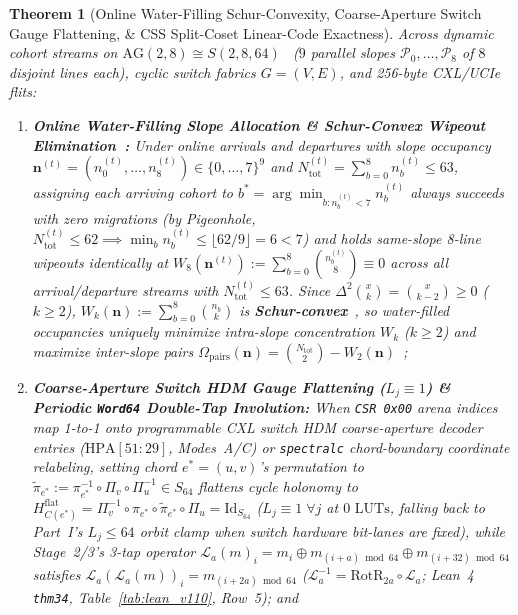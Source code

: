 \documentclass[10pt,twocolumn]{article}
\theoremstyle{spectralthm}
\newtheorem{theorem}{Theorem}[section]
\begin{document}
\begin{theorem}[Online Water-Filling Schur-Convexity, Coarse-Aperture Switch Gauge Flattening, \& CSS Split-Coset Linear-Code Exactness]
\label{thm:homological_unification}
Across dynamic cohort streams on $\mathrm{AG}(2,8) \cong S(2,8,64)$~\cite{kautz1964nonrandom,welch1974lower,macwilliams1977theory} ($9$ parallel slopes $\mathcal{P}_0,\ldots,\mathcal{P}_8$ of $8$ disjoint lines each), cyclic switch fabrics $G = (V,E)$, and 256-byte CXL/UCIe flits:
\begin{enumerate}
  \item[(i)] \textbf{Online Water-Filling Slope Allocation \& Schur-Convex Wipeout Elimination~\cite{marshall2011inequalities}:} Under online arrivals and departures with slope occupancy $\mathbf{n}^{(t)} = (n_0^{(t)},\ldots,n_8^{(t)}) \in \{0,\ldots,7\}^9$ and $N_{\mathrm{tot}}^{(t)} = \sum_{b=0}^8 n_b^{(t)} \le 63$, assigning each arriving cohort to $b^* = \arg\min_{b : n_b^{(t)} < 7} n_b^{(t)}$ always succeeds with \emph{zero migrations} (by Pigeonhole, $N_{\mathrm{tot}}^{(t)} \le 62 \implies \min_b n_b^{(t)} \le \lfloor 62/9 \rfloor = 6 < 7$) and holds same-slope 8-line wipeouts identically at $W_8(\mathbf{n}^{(t)}) := \sum_{b=0}^8 \binom{n_b^{(t)}}{8} \equiv 0$ across all arrival/departure streams with $N_{\mathrm{tot}}^{(t)} \le 63$. Since $\Delta^2 \binom{x}{k} = \binom{x}{k-2} \ge 0$ ($k \ge 2$), $W_k(\mathbf{n}) := \sum_{b=0}^8 \binom{n_b}{k}$ is \textbf{Schur-convex}~\cite{marshall2011inequalities}, so water-filled occupancies uniquely minimize intra-slope concentration $W_k$ ($k \ge 2$) and maximize inter-slope pairs $\Omega_{\mathrm{pairs}}(\mathbf{n}) = \binom{N_{\mathrm{tot}}}{2} - W_2(\mathbf{n})$~\cite{calinescu2011maximizing};
  \item[(ii)] \textbf{Coarse-Aperture Switch HDM Gauge Flattening ($L_j \equiv 1$) \& Periodic \texttt{Word64} Double-Tap Involution:} When \texttt{CSR 0x00} arena indices map 1-to-1 onto programmable CXL switch HDM coarse-aperture decoder entries ($\mathrm{HPA}[51:29]$, Modes~A/C) or \texttt{spectralc} chord-boundary coordinate relabeling, setting chord $e^* = (u,v)$'s permutation to $\widetilde{\pi}_{e^*} := \pi_{e^*}^{-1} \circ \Pi_v \circ \Pi_u^{-1} \in S_{64}$ flattens cycle holonomy to $H_{C(e^*)}^{\mathrm{flat}} = \Pi_v^{-1} \circ \pi_{e^*} \circ \widetilde{\pi}_{e^*} \circ \Pi_u = \mathrm{Id}_{S_{64}}$ ($L_j \equiv 1\;\forall j$ at $0\text{~LUTs}$, falling back to Part~I's $L_j \le 64$ orbit clamp when switch hardware bit-lanes are fixed), while Stage~2/3's 3-tap operator $\mathcal{L}_a(m)_i = m_i \oplus m_{(i+a)\bmod 64} \oplus m_{(i+32)\bmod 64}$ satisfies $\mathcal{L}_a(\mathcal{L}_a(m))_i = m_{(i+2a)\bmod 64}$ ($\mathcal{L}_a^{-1} = \mathrm{RotR}_{2a}\circ\mathcal{L}_a$; Lean~4 \texttt{thm34}, Table~\ref{tab:lean_v110}, Row~5); and

\end{enumerate}
\end{theorem}
\end{document}
